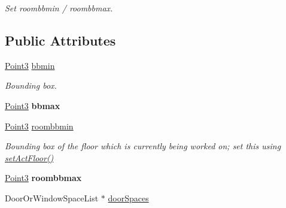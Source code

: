\begin{DoxyCompactItemize}
\begin{DoxyCompactList}\small\item\em \-Set roombbmin / roombbmax. \end{DoxyCompactList}\end{DoxyCompactItemize}
\subsection*{\-Public \-Attributes}
\begin{DoxyCompactItemize}
\item 
\hypertarget{structLevel_1_1Building_aa28ab856555f670ddffd9fa348b93b40}{
\hyperlink{classPoint3}{\-Point3} \hyperlink{structLevel_1_1Building_aa28ab856555f670ddffd9fa348b93b40}{bbmin}}
\label{db/da2/structLevel_1_1Building_aa28ab856555f670ddffd9fa348b93b40}

\begin{DoxyCompactList}\small\item\em \-Bounding box. \end{DoxyCompactList}\item 
\hypertarget{structLevel_1_1Building_a7ecbaec7832f9df4a999dd5f5649e90f}{
\hyperlink{classPoint3}{\-Point3} {\bfseries bbmax}}
\label{db/da2/structLevel_1_1Building_a7ecbaec7832f9df4a999dd5f5649e90f}

\item 
\hypertarget{structLevel_1_1Building_ab980b2fe0973ad81dbe1172df50fb6ff}{
\hyperlink{classPoint3}{\-Point3} \hyperlink{structLevel_1_1Building_ab980b2fe0973ad81dbe1172df50fb6ff}{roombbmin}}
\label{db/da2/structLevel_1_1Building_ab980b2fe0973ad81dbe1172df50fb6ff}

\begin{DoxyCompactList}\small\item\em \-Bounding box of the floor which is currently being worked on; set this using \hyperlink{structLevel_1_1Building_a3224b49575fa8e4ec1f31012421de85b}{set\-Act\-Floor()} \end{DoxyCompactList}\item 
\hypertarget{structLevel_1_1Building_a8b854edc5bf65928c47aef0dd7377688}{
\hyperlink{classPoint3}{\-Point3} {\bfseries roombbmax}}
\label{db/da2/structLevel_1_1Building_a8b854edc5bf65928c47aef0dd7377688}

\item 
\hypertarget{structLevel_1_1Building_ae4e82454c0d62ab2967748f0bf690252}{
\-Door\-Or\-Window\-Space\-List $\ast$ \hyperlink{structLevel_1_1Building_ae4e82454c0d62ab2967748f0bf690252}{door\-Spaces}}
\label{db/da2/structLevel_1_1Building_ae4e82454c0d62ab2967748f0bf690252}


\end{DoxyCompactItemize}
